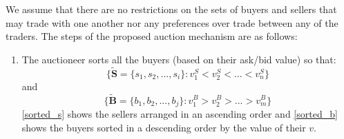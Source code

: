 We assume that there are no restrictions on the sets of buyers and sellers that may trade with one another nor any preferences over trade between any of the traders. The steps of the proposed auction mechanism are as follows:
\begin{enumerate}
\item The auctioneer sorts all the buyers (based on their ask/bid value) so that:
\begin{equation}
\{\tilde{\mathbf{S}} = \{s_{1}, s_{2}, ...,s_{i}\} : v^S_{1}<v^S_{2}<...<v^S_{n}\}
\label{sorted_s}
\end{equation}
and
\begin{equation}
\{\tilde{\mathbf{B}} = \{b_{1}, b_{2}, ...,b_{j}\} : v^B_{1}>v^B_{2}>...>v^B_{m}\}
\label{sorted_b}
\end{equation}
\autoref{sorted_s} shows the sellers arranged in an ascending order and \autoref{sorted_b} shows the buyers sorted in a descending order by the value of their $v$.


\end{enumerate}
